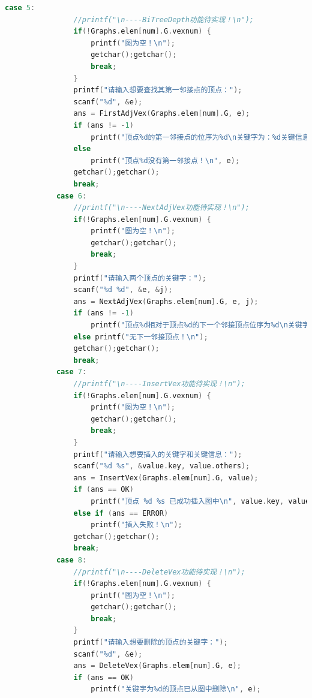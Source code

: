 \documentclass[supercite]{Experimental_Report}
\theoremstyle{definition}
\begin{document}
\begin{lstlisting}[language=c]
            case 5:
                //printf("\n----BiTreeDepth功能待实现！\n");
                if(!Graphs.elem[num].G.vexnum) {
                    printf("图为空！\n");
                    getchar();getchar();
                    break;
                }
				printf("请输入想要查找其第一邻接点的顶点：");
	            scanf("%d", &e);
	            ans = FirstAdjVex(Graphs.elem[num].G, e);
				if (ans != -1)
	                printf("顶点%d的第一邻接点的位序为%d\n关键字为：%d关键信息为：%s\n", e, ans, Graphs.elem[num].G.vertices[ans].data.key, Graphs.elem[num].G.vertices[ans].data.others);
	            else
	                printf("顶点%d没有第一邻接点！\n", e);
                getchar();getchar();
                break;
            case 6:
                //printf("\n----NextAdjVex功能待实现！\n");
                if(!Graphs.elem[num].G.vexnum) {
                    printf("图为空！\n");
                    getchar();getchar();
                    break;
                }
                printf("请输入两个顶点的关键字：");
	            scanf("%d %d", &e, &j);
	            ans = NextAdjVex(Graphs.elem[num].G, e, j);
	            if (ans != -1)
	                printf("顶点%d相对于顶点%d的下一个邻接顶点位序为%d\n关键字为：%d关键信息为：%s\n", e, j, ans, Graphs.elem[num].G.vertices[ans].data.key, Graphs.elem[num].G.vertices[ans].data.others);
	            else printf("无下一邻接顶点！\n");
                getchar();getchar();
                break;
            case 7:
                //printf("\n----InsertVex功能待实现！\n");
                if(!Graphs.elem[num].G.vexnum) {
                    printf("图为空！\n");
                    getchar();getchar();
                    break;
                }
                printf("请输入想要插入的关键字和关键信息：");
	            scanf("%d %s", &value.key, value.others);
	            ans = InsertVex(Graphs.elem[num].G, value);
	            if (ans == OK)
					printf("顶点 %d %s 已成功插入图中\n", value.key, value.others);
		        else if (ans == ERROR)
		            printf("插入失败！\n");
                getchar();getchar();
                break;
            case 8:
                //printf("\n----DeleteVex功能待实现！\n");
                if(!Graphs.elem[num].G.vexnum) {
                    printf("图为空！\n");
                    getchar();getchar();
                    break;
                }
	            printf("请输入想要删除的顶点的关键字：");
	            scanf("%d", &e);
	            ans = DeleteVex(Graphs.elem[num].G, e);
	            if (ans == OK)
	                printf("关键字为%d的顶点已从图中删除\n", e);

\end{lstlisting}
\end{document}
